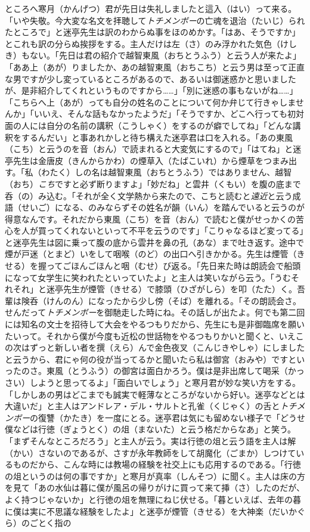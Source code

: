 \documentclass{book}
\begin{document}
ところへ寒月（かんげつ）君が先日は失礼しましたと這入（はい）って来る。「いや失敬。今大変な名文を拝聴して\emph{トチメンボー}の亡魂を退治（たいじ）られたところで」と迷亭先生は訳のわからぬ事をほのめかす。「はあ、そうですか」とこれも訳の分らぬ挨拶をする。主人だけは左（さ）のみ浮かれた気色（けしき）もない。「先日は君の紹介で越智東風（おちとうふう）と云う人が来たよ」「ああ上（あが）りましたか、あの越智東風（おちこち）と云う男は至って正直な男ですが少し変っているところがあるので、あるいは御迷惑かと思いましたが、是非紹介してくれというものですから\ldots{}\ldots{}」「別に迷惑の事もないがね\ldots{}\ldots{}」「こちらへ上（あが）っても自分の姓名のことについて何か弁じて行きゃしませんか」「いいえ、そんな話もなかったようだ」「そうですか、どこへ行っても初対面の人には自分の名前の講釈（こうしゃく）をするのが癖でしてね」「どんな講釈をするんだい」と事あれかしと待ち構えた迷亭君は口を入れる。「あの東風（こち）と云うのを音（おん）で読まれると大変気にするので」「はてね」と迷亭先生は金唐皮（きんからかわ）の煙草入（たばこいれ）から煙草をつまみ出す。「私（わたく）しの名は越智東風（おちとうふう）ではありません、越智（おち）\emph{こち}ですと必ず断りますよ」「妙だね」と雲井（くもい）を腹の底まで呑（の）み込む。「それが全く文学熱から来たので、こちと読むと\emph{遠近}と云う成語（せいご）になる、のみならずその姓名が韻（いん）を踏んでいると云うのが得意なんです。それだから東風（こち）を音（おん）で読むと僕がせっかくの苦心を人が買ってくれないといって不平を云うのです」「こりゃなるほど変ってる」と迷亭先生は図に乗って腹の底から雲井を鼻の孔（あな）まで吐き返す。途中で煙が戸迷（とまど）いをして咽喉（のど）の出口へ引きかかる。先生は煙管（きせる）を握ってごほんごほんと咽（むせ）び返る。「先日来た時は朗読会で船頭になって女学生に笑われたといっていたよ」と主人は笑いながら云う。「うむそれそれ」と迷亭先生が煙管（きせる）で膝頭（ひざがしら）を叩（たた）く。吾輩は険呑（けんのん）になったから少し傍（そば）を離れる。「その朗読会さ。せんだって\emph{トチメンボー}を御馳走した時にね。その話しが出たよ。何でも第二回には知名の文士を招待して大会をやるつもりだから、先生にも是非御臨席を願いたいって。それから僕が今度も近松の世話物をやるつもりかいと聞くと、いえこの次はずっと新しい者を撰（えら）んで金色夜叉（こんじきやしゃ）にしましたと云うから、君にゃ何の役が当ってるかと聞いたら私は御宮（おみや）ですといったのさ。東風（とうふう）の御宮は面白かろう。僕は是非出席して喝采（かっさい）しようと思ってるよ」「面白いでしょう」と寒月君が妙な笑い方をする。「しかしあの男はどこまでも誠実で軽薄なところがないから好い。迷亭などとは大違いだ」と主人はアンドレア・デル・サルトと孔雀（くじゃく）の舌と\emph{トチメンボー}の復讐（かたき）を一度にとる。迷亭君は気にも留めない様子で「どうせ僕などは行徳（ぎょうとく）の俎（まないた）と云う格だからなあ」と笑う。「まずそんなところだろう」と主人が云う。実は行徳の俎と云う語を主人は解（かい）さないのであるが、さすが永年教師をして胡魔化（ごまか）しつけているものだから、こんな時には教場の経験を社交上にも応用するのである。「行徳の俎というのは何の事ですか」と寒月が真率（しんそつ）に聞く。主人は床の方を見て「あの水仙は暮に僕が風呂の帰りがけに買って来て挿（さ）したのだが、よく持つじゃないか」と行徳の俎を無理にねじ伏せる。「暮といえば、去年の暮に僕は実に不思議な経験をしたよ」と迷亭が煙管（きせる）を大神楽（だいかぐら）のごとく指の
\end{document}
